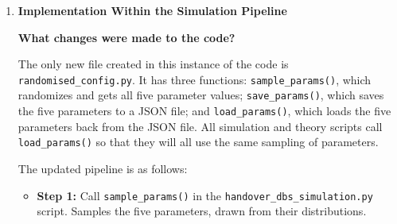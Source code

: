 \documentclass[11pt]{article}
\newcommand{\subquestion}[1]{
    \vspace{0.3cm}
    \noindent\textbf{#1}
    \vspace{0.1cm}
}
\begin{document}
\begin{enumerate}[label=\textbf{Scribe Question \arabic*:}, leftmargin=*, itemsep=1.5em]
\begin{itemize}[leftmargin=*, itemsep=0.3em]
    \item \textbf{Displacement Theorem (Lemma 1):} This result guarantees that drones remain
          Poisson-distributed at every instant regardless of how they move, for any $\lambda_0$ ---
          our randomized value still falls within that guarantee.

    \item \textbf{Speed PDF for DSM (Lemma 3):} Lemma 3 applies to any valid speed distribution
          $f_v(v)$, so choosing a different Rayleigh sigma $\sigma$ just plugs a different valid
          distribution into the same formula without breaking anything.

    \item \textbf{Exclusion radius $u_0$:} Varying $u_0$ across the $300$--$800$ m range captures
          the reality that drones don't always land at the same distance from a user.
\end{itemize}

\subquestion{Why is this expected to improve the analysis?}

The randomized approach doesn't change the underlying handover physics. What it does is make our
conclusions far more defensible. A finding that holds across many independently drawn parameter
settings is substantially more convincing than one that was only ever verified at a single
hand-picked configuration.

\newpage
\item \textbf{Implementation Within the Simulation Pipeline}

\subquestion{What changes were made to the code?}

The only new file created in this instance of the code is \texttt{randomised\_config.py}. It has three
functions: \texttt{sample\_params()}, which randomizes and gets all five parameter values;
\texttt{save\_params()}, which saves the five parameters to a JSON file; and \texttt{load\_params()},
which loads the five parameters back from the JSON file. All simulation and theory scripts call
\texttt{load\_params()} so that they will all use the same sampling of parameters.

The updated pipeline is as follows:

\begin{itemize}[leftmargin=*, itemsep=0.3em]
    \item \textbf{Step 1:} Call \texttt{sample\_params()} in the \texttt{handover\_dbs\_simulation.py}
          script. Samples the five parameters, drawn from their distributions.


\end{itemize}
\end{enumerate}
\end{document}
